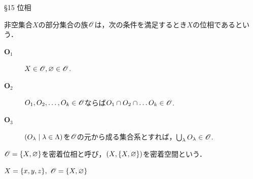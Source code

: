 \documentclass[uplatex,a4paper,dvipdfmx,aspectratio=169,11pt]{beamer}
\begin{document}
\begin{frame}[fragile]{\S 15 位相}
    \begin{block}{}
        非空集合$X$の部分集合の族$\mathscr{O}$は，次の条件を満足するとき$X$の\alert{位相}であるという．
       \begin{description}
           \item[$\textbf{O}_1$] $X \in \mathscr{O}, \varnothing \in \mathscr{O}$.
           \item[$\textbf{O}_2$] $O_1, O_2, \ldots, O_k \in \mathscr{O}$ならば$O_1 \cap O_2 \cap \dots O_k \in \mathscr{O}$.
           \item[$\textbf{O}_3$] $\qty(O_\lambda \mid \lambda \in \Lambda)$を$\mathscr{O}$の元から成る集合系とすれば，$\bigcup_\lambda O_\lambda \in \mathscr{O}$.
       \end{description} 
    \end{block}

    \begin{exampleblock}{}
        $\mathscr{O} = \qty{X, \varnothing}$を\alert{密着位相}と呼び，$(X, \qty{X, \varnothing})$を\alert{密着空間}という．
    \end{exampleblock}

    \medskip{}

    $X = \qty{x, y, z},\ \mathscr{O} = \qty{X, \varnothing}$
    \begin{figure}[H]
        \centering
    \end{figure}
\end{frame}
\end{document}

